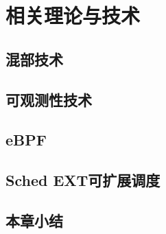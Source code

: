 \chapter{相关理论与技术}\label{chap:theories_tech}

\section{混部技术}

\section{可观测性技术}

\section{eBPF}

\section{Sched EXT可扩展调度}

\section{本章小结}